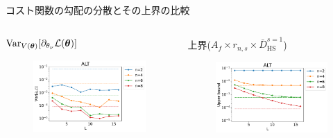 \documentclass[dvipdfmx,10pt,aspectratio=169]{beamer}
\begin{document}
\begin{frame}{コスト関数の勾配の分散とその上界の比較}\label{qml-var-alt}
    \begin{columns}
        \begin{column}{0.5\textwidth}
            \centering $\operatorname{Var}_{V(\vb*{\theta})}[\partial_{\theta_\nu} \mathcal{L}(\vb*{\theta})]$
            \vspace{-10pt}
            \begin{figure}
                \centering\includegraphics[width=7cm]{qml-var-alt.pdf}
            \end{figure}
        \end{column}
        \begin{column}{0.5\textwidth}
            \centering 上界($A_f \times r_{n,s} \times \bar{D}_{\mathrm{HS}}^{s=1}$)
            \vspace{-10pt}
            \begin{figure}
                \centering\includegraphics[width=7cm]{qml-var-bound-alt.pdf}
            \end{figure}
        \end{column}
    \end{columns}
    

\end{frame}
\end{document}
